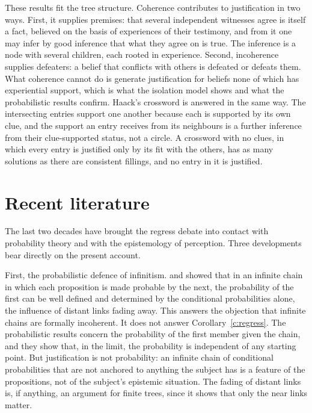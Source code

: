 \documentclass{situationist-preprint}
\begin{document}
These results fit the tree structure. Coherence contributes to justification in two ways. First, it supplies premises: that several independent witnesses agree is itself a fact, believed on the basis of experiences of their testimony, and from it one may infer by good inference that what they agree on is true. The inference is a node with several children, each rooted in experience. Second, incoherence supplies defeaters: a belief that conflicts with others is defeated or defeats them. What coherence cannot do is generate justification for beliefs none of which has experiential support, which is what the isolation model shows and what the probabilistic results confirm. Haack's crossword is answered in the same way. The intersecting entries support one another because each is supported by its own clue, and the support an entry receives from its neighbours is a further inference from their clue-supported status, not a circle. A crossword with no clues, in which every entry is justified only by its fit with the others, has as many solutions as there are consistent fillings, and no entry in it is justified.

\section{Recent literature}\label{s:recent}

The last two decades have brought the regress debate into contact with probability theory and with the epistemology of perception. Three developments bear directly on the present account.

First, the probabilistic defence of infinitism. \citet{Peijnenburg2007} and \citet{AtkinsonPeijnenburg2017} showed that in an infinite chain in which each proposition is made probable by the next, the probability of the first can be well defined and determined by the conditional probabilities alone, the influence of distant links fading away. This answers the objection that infinite chains are formally incoherent. It does not answer Corollary~\ref{c:regress}. The probabilistic results concern the probability of the first member given the chain, and they show that, in the limit, the probability is independent of any starting point. But justification is not probability: an infinite chain of conditional probabilities that are not anchored to anything the subject has is a feature of the propositions, not of the subject's epistemic situation. The fading of distant links is, if anything, an argument for finite trees, since it shows that only the near links matter.
\end{document}
